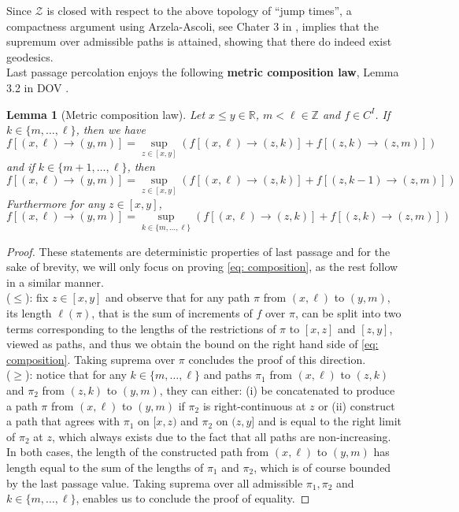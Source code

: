 \documentclass[12pt]{report}
\theoremstyle{plain}
\newtheorem{lemma}[theorem]{Lemma}
\begin{document}
Since \(\mathcal Z\) is closed with respect to the above topology of \textquotedblleft jump times\textquotedblright, a compactness argument using Arzela-Ascoli, see Chater $3$ in \cite{billingsley2013convergence}, implies that the supremum over admissible paths is attained, showing that there do indeed exist geodesics. \\

Last passage percolation enjoys the following \textbf{metric composition law}, Lemma 3.2 in DOV \cite{DOV}.

\begin{lemma}[Metric composition law]\label{Lemma: Metric Composition}
    Let \(x\leq y \in \mathbb{R}\), \(m < \ell\in\mathbb{Z}\) and \(f\in C^I\). If \(k\in \{m, \dots, \ell\}\), then we have
    \[
    f[(x,\ell)\to(y,m)] = \displaystyle \sup_{z\in[x,y]}(f[(x,\ell)\to(z,k)]+f[(z,k)\to(z,m)])
    \]
    and if \(k\in \{m+1, \dots, \ell\}\), then 
    \[
    f[(x,\ell)\to(y,m)] = \displaystyle \sup_{z\in[x,y]}(f[(x,\ell)\to(z,k)]+f[(z,k-1)\to(z,m)])
    \]
    Furthermore for any \(z\in [x,y]\), 
    \begin{equation}\label{eq: composition}
    f[(x,\ell)\to(y,m)] = \displaystyle \sup_{k\in \{m, \dots, \ell\}}(f[(x,\ell)\to(z,k)]+f[(z,k)\to(z,m)])
    \end{equation}
\end{lemma}%
\begin{proof}
These statements are deterministic properties of last passage and for the sake of brevity, we will only focus on proving \ref{eq: composition}, as the rest follow in a similar manner.\\
\indent (\(\leq\)): fix \(z\in[x,y]\) and observe that for any path \(\pi\) from \((x,\ell)\) to \((y,m)\), its length \(\ell(\pi)\), that is the sum of increments of \(f\) over \(\pi\), can be split into two terms corresponding to the lengths of the restrictions of \(\pi\) to \([x,z]\) and \([z,y]\), viewed as paths, and thus we obtain the bound on the right hand side of \ref{eq: composition}. Taking suprema over \(\pi\) concludes the proof of this direction.\\
\indent (\(\geq\)): notice that for any \(k\in\{m, \dots, \ell\}\)
and paths \(\pi_1\) from \((x,\ell)\) to \((z,k)\) and \(\pi_2\) from \((z,k)\) to \((y,m)\), they can either:
(i) be concatenated to produce a path \(\pi\) from \((x,\ell)\) to \((y,m)\) if \(\pi_2\) is right-continuous at \(z\)
or
(ii) construct a path that agrees with \(\pi_1\) on \([x,z)\) and \(\pi_2\) on \((z, y]\) and is equal to the right limit of \(\pi_2\) at \(z\), which always exists due to the fact that all paths are non-increasing. In both cases, the length of the constructed path from \((x,\ell)\) to \((y,m)\) has length equal to the sum of the lengths of \(\pi_1\) and \(\pi_2\), which is of course bounded by the last passage value. Taking suprema over all admissible \(\pi_1, \pi_2\) and \(k\in \{m,\dots, \ell\}\), enables us to conclude the proof of equality. 
\end{proof}
\end{document}
